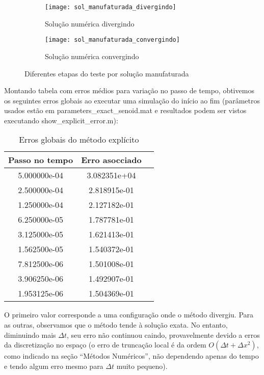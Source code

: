 \documentclass[12pt,fleqn]{article}
\begin{document}
\begin{figure}[H]
	\centering
	\begin{subfigure}{.5\textwidth}
		\centering
		\texttt{[image: sol\_manufaturada\_divergindo]}
		\caption{Solução numérica divergindo}
	\end{subfigure}%
	\begin{subfigure}{.5\textwidth}
		\centering
		\texttt{[image: sol\_manufaturada\_convergindo]}
		\caption{Solução numérica convergindo}
	\end{subfigure}
	\caption{Diferentes etapas do teste por solução manufaturada}
	\label{fig:diverge_sol_manufaturada_expl}
\end{figure}

Montando tabela com erros médios para variação no passo de tempo, obtivemos os seguintes erros globais ao executar uma simulação do início ao fim (parâmetros usados estão em parameters\_exact\_senoid.mat e resultados podem ser vistos executando show\_explicit\_error.m):

\begin{table}[htb]
\begin{center}
		\begin{tabular}{|c|c|c|}\hline
			Passo no tempo & Erro asocciado \\\hline
			5.000000e-04 & 3.082351e+04 \\\hline
			2.500000e-04 & 2.818915e-01 \\\hline
			1.250000e-04 & 2.127182e-01 \\\hline
			6.250000e-05 & 1.787781e-01 \\\hline
			3.125000e-05 & 1.621413e-01 \\\hline
			1.562500e-05 & 1.540372e-01 \\\hline
			7.812500e-06 & 1.501008e-01 \\\hline
			3.906250e-06 & 1.492907e-01 \\\hline
			1.953125e-06 & 1.504369e-01 \\\hline
		\end{tabular}
\caption{Erros globais do método explícito}
\end{center}
\end{table}

O primeiro valor corresponde a uma configuração onde o método divergiu. Para as outras, observamos que o método tende à solução exata. No entanto, diminuindo mais $\Delta t$, seu erro não continuou caindo, provavelmente devido a erros da discretização no espaço (o erro de truncação local é da ordem $O(\Delta t + \Delta x^2)$, como indicado na seção ``Métodos Numéricos'', não dependendo apenas do tempo e tendo algum erro mesmo para $\Delta t$ muito pequeno).
\end{document}
